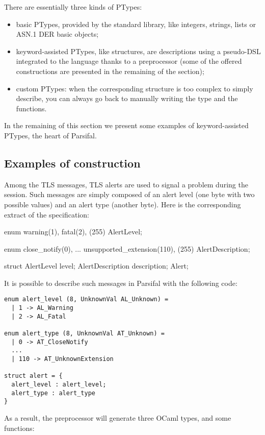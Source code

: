 \documentclass[conference]{IEEEtran}
\newenvironment{code}%
   {\scriptsize\snugshade\verbatim}%
   {\endverbatim\endsnugshade\normalsize}
\begin{document}
There are essentially three kinds of PTypes:
\begin{itemize}
\item basic PTypes, provided by the standard library, like integers,
  strings, lists or ASN.1 DER basic objects;
\item keyword-assisted PTypes, like structures, are descriptions using
  a pseudo-DSL integrated to the language thanks to a preprocessor
  (some of the offered constructions are presented in the remaining of
  the section);
\item custom PTypes: when the corresponding structure is too complex
  to simply describe, you can always go back to manually writing the
  type and the functions.
\end{itemize}

In the remaining of this section we present some examples of
keyword-assisted PTypes, the heart of Parsifal.


\subsection{Examples of construction}

Among the TLS messages, TLS alerts are used to signal a problem during
the session. Such messages are simply composed of an alert level (one
byte with two possible values) and an alert type (another byte). Here
is the corresponding extract of the specification:

\begin{code}
enum { warning(1), fatal(2), (255) } AlertLevel;

enum {
    close_notify(0),
     ...
    unsupported_extension(110),
    (255)
} AlertDescription;

struct {
    AlertLevel level;
    AlertDescription description;
} Alert;
\end{code}

\noindent
It is possible to describe such messages in Parsifal with the
following code:
\begin{lstlisting}
enum alert_level (8, UnknownVal AL_Unknown) =
  | 1 -> AL_Warning
  | 2 -> AL_Fatal

enum alert_type (8, UnknownVal AT_Unknown) =
  | 0 -> AT_CloseNotify
  ...
  | 110 -> AT_UnknownExtension

struct alert = {
  alert_level : alert_level;
  alert_type : alert_type
}
\end{lstlisting}

\noindent
As a result, the preprocessor will generate three OCaml types, and
some functions:
\end{document}
